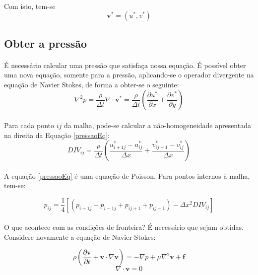\documentclass[poisson.tex]{subfiles}
\begin{document}
\paragraph{} Com isto, tem-se \[\textbf{v}^{*}=(u^*,v^*)\]
\subsection{Obter a pressão}
\paragraph{} É necessário calcular uma pressão que satisfaça nossa equação. É possível obter uma nova equação, somente para a pressão, aplicando-se o operador divergente na equação de Navier Stokes, de forma a obter-se o seguinte:
\begin{equation}
\nabla^2 p = \frac{\rho}{\Delta t} \nabla\cdot \textbf{v}^*=\frac{\rho}{\Delta t} 
\left( \frac{\partial u^*}{\partial x}+\frac{\partial v^*}{\partial y} \right) \label{pressaoEq}
\end{equation}
\paragraph{} Para cada ponto $ij$ da malha, pode-se calcular a não-homogeneidade apresentada na direita da Equação \ref{pressaoEq}:
\begin{equation}
DIV_{ij}=\frac{\rho}{\Delta t}\left( \frac{u_{i+1j}^*-u_{ij}^*}{\Delta x}+\frac{v_{ij+1}^*-v_{ij}^*}{\Delta x}\right)
\end{equation}
\paragraph{} A equação \ref{pressaoEq} é uma equação de Poisson. Para pontos internos à malha, tem-se:

\begin{equation}
p_{ij}=\frac{1}{4}[(p_{i+1j}+p_{i-1j}+p_{ij+1}+p_{ij-1})-\Delta x^2 DIV_{ij}]
\end{equation}

\paragraph{} O que acontece com as condições de fronteira? É necessário que sejam obtidas. Considere novamente a equação de Navier Stokes:

\[\rho\left( \frac{\partial \textbf{v}}{\partial t}+\textbf{v}\cdot\nabla\textbf{v}\right)=-\nabla p+\mu\nabla^2\textbf{v}+\textbf{f}\]
\[\nabla\cdot\textbf{v}=0\]
\end{document}
